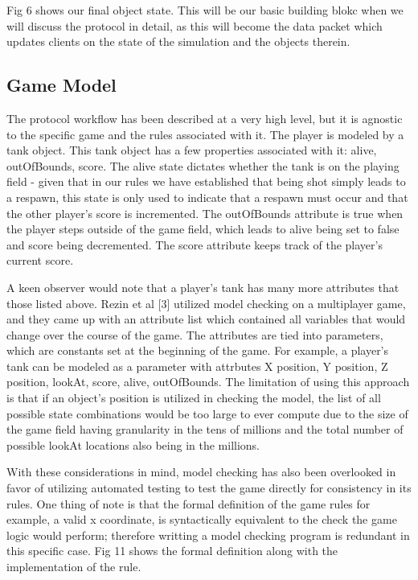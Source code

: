 \documentclass[conference]{IEEEtran}
\begin{document}
Fig 6 shows our final object state. This will be our basic building blokc when we will discuss the protocol in detail, 
as this will become the data packet which updates clients on the state of the simulation and the objects therein. 

\subsection{Game Model}

The protocol workflow has been described at a very high level, but it is agnostic to the specific game and the rules associated with it. The 
player is modeled by a tank object. This tank object has a few properties associated with it: alive, outOfBounds, score. The alive state 
dictates whether the tank is on the playing field - given that in our rules we have established that being shot simply leads to a respawn, 
this state is only used to indicate that a respawn must occur and that the other player's score is incremented. The outOfBounds attribute is true 
when the player steps outside of the game field, which leads to alive being set to false and score being decremented. The score attribute 
keeps track of the player's current score. 

A keen observer would note that a player's tank has many more attributes that those listed above. Rezin et al [3] utilized model checking 
on a multiplayer game, and they came up with an attribute list which contained all variables that would change over the course of the game.
The attributes are tied into parameters, which are constants set at the beginning of the game. For example, a player's tank can be modeled
as a parameter with attrbutes X position, Y position, Z position, lookAt, score, alive, outOfBounds. The limitation of using this approach is that 
if an object's position is utilized in checking the model, the list of all possible state combinations would be too large to ever compute due 
to the size of the game field having granularity in the tens of millions and the total number of possible lookAt locations also being in the millions.

With these considerations in mind, model checking has also been overlooked in favor of utilizing automated testing to test the 
game directly for consistency in its rules. One thing of note is that the formal definition of the game rules for example, a valid x coordinate,
is syntactically equivalent to the check the game logic would perform; therefore writting a model checking program is redundant in this specific 
case. Fig 11 shows the formal definition along with the implementation of the rule. 
\end{document}
